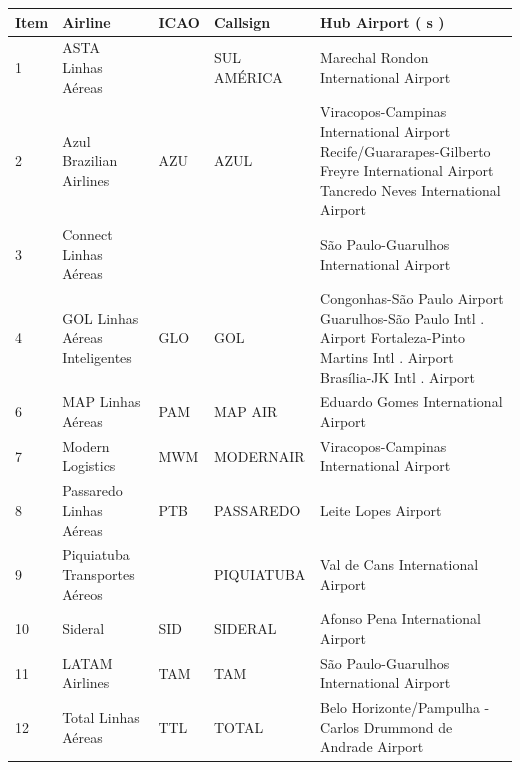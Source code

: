 \documentclass{article}
\begin{document}
\begin{tabular}{lllll}
\toprule
Item & Airline & ICAO & Callsign & Hub Airport ( s ) \\
\midrule
1 & ASTA Linhas Aéreas &  & SUL AMÉRICA & Marechal Rondon International Airport \\
2 & Azul Brazilian Airlines & AZU & AZUL & Viracopos-Campinas International Airport Recife/Guararapes-Gilberto Freyre International Airport Tancredo Neves International Airport \\
3 & Connect Linhas Aéreas &  &  & São Paulo-Guarulhos International Airport \\
4 & GOL Linhas Aéreas Inteligentes & GLO & GOL & Congonhas-São Paulo Airport Guarulhos-São Paulo Intl . Airport Fortaleza-Pinto Martins Intl . Airport Brasília-JK Intl . Airport \\
6 & MAP Linhas Aéreas & PAM & MAP AIR & Eduardo Gomes International Airport \\
7 & Modern Logistics & MWM & MODERNAIR & Viracopos-Campinas International Airport \\
8 & Passaredo Linhas Aéreas & PTB & PASSAREDO & Leite Lopes Airport \\
9 & Piquiatuba Transportes Aéreos &  & PIQUIATUBA & Val de Cans International Airport \\
10 & Sideral & SID & SIDERAL & Afonso Pena International Airport \\
11 & LATAM Airlines & TAM & TAM & São Paulo-Guarulhos International Airport \\
12 & Total Linhas Aéreas & TTL & TOTAL & Belo Horizonte/Pampulha - Carlos Drummond de Andrade Airport \\
\bottomrule
\end{tabular}
\end{document}
